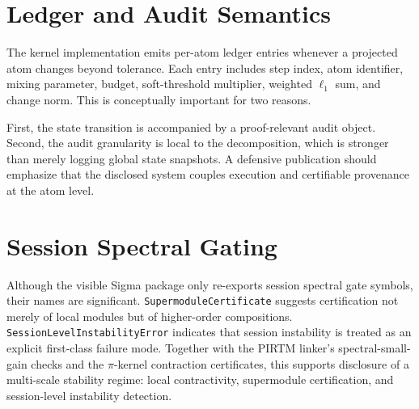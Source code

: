 \documentclass[11pt]{article}
\begin{document}
\section{Ledger and Audit Semantics}
The kernel implementation emits per-atom ledger entries whenever a projected atom changes beyond tolerance. Each entry includes step index, atom identifier, mixing parameter, budget, soft-threshold multiplier, weighted $\ell_1$ sum, and change norm. This is conceptually important for two reasons.

First, the state transition is accompanied by a proof-relevant audit object. Second, the audit granularity is local to the decomposition, which is stronger than merely logging global state snapshots. A defensive publication should emphasize that the disclosed system couples execution and certifiable provenance at the atom level.

\section{Session Spectral Gating}
Although the visible Sigma package only re-exports session spectral gate symbols, their names are significant. \texttt{SupermoduleCertificate} suggests certification not merely of local modules but of higher-order compositions. \texttt{SessionLevelInstabilityError} indicates that session instability is treated as an explicit first-class failure mode. Together with the PIRTM linker's spectral-small-gain checks and the $\pi$-kernel contraction certificates, this supports disclosure of a multi-scale stability regime: local contractivity, supermodule certification, and session-level instability detection.
\end{document}
